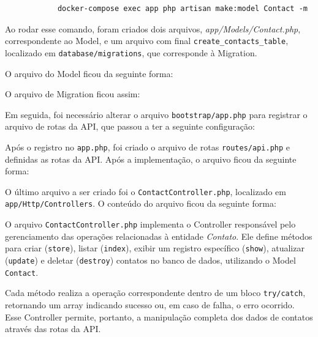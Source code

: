             \begin{verbatim}
            docker-compose exec app php artisan make:model Contact -m
            \end{verbatim}
            
            \par Ao rodar esse comando, foram criados dois arquivos, \textit{app/Models/Contact.php}, correspondente ao Model, e um arquivo com final \texttt{create\_contacts\_table}, localizado em \texttt{database/migrations}, que corresponde à Migration. 

            \par O arquivo do Model ficou da seguinte forma:
            
            
            
            \par O arquivo de Migration ficou assim:
            
            
            
            \par Em seguida, foi necessário alterar o arquivo \texttt{bootstrap/app.php} para registrar o arquivo de rotas da API, que passou a ter a seguinte configuração:
            
            
            
            \par Após o registro no \texttt{app.php}, foi criado o arquivo de rotas \texttt{routes/api.php} e definidas as rotas da API. Após a implementação, o arquivo ficou da seguinte forma:
            
            

            \sloppy
            \par O último arquivo a ser criado foi o \texttt{ContactController.php}, localizado em \texttt{app/Http/Controllers}. O conteúdo do arquivo ficou da seguinte forma:
            \vspace{1cm}  %

            

            \par O arquivo \texttt{ContactController.php} implementa o Controller responsável pelo gerenciamento das operações relacionadas à entidade \textit{Contato}. Ele define métodos para criar (\texttt{store}), listar (\texttt{index}), exibir um registro específico (\texttt{show}), atualizar (\texttt{update}) e deletar (\texttt{destroy}) contatos no banco de dados, utilizando o Model \texttt{Contact}. 
            
            \par Cada método realiza a operação correspondente dentro de um bloco \texttt{try/catch}, retornando um array indicando sucesso ou, em caso de falha, o erro ocorrido. Esse Controller permite, portanto, a manipulação completa dos dados de contatos através das rotas da API.

